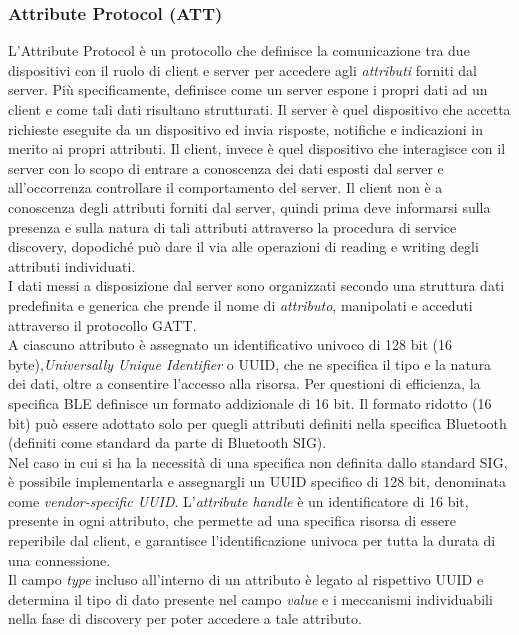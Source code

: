 \subsubsection{Attribute Protocol (ATT)}
L'Attribute Protocol è un protocollo che definisce la comunicazione tra due dispositivi con il ruolo di client e server per accedere agli \textit{attributi} forniti dal server. Più specificamente, definisce come un server espone i propri dati ad un client e come tali dati risultano strutturati.
Il server è quel dispositivo che accetta richieste eseguite da un dispositivo ed invia risposte, notifiche e indicazioni in merito ai propri attributi. %
Il client, invece è quel dispositivo che interagisce con il server con lo scopo di entrare a conoscenza dei dati esposti dal server e all'occorrenza controllare il comportamento del server. Il client non è a conoscenza degli attributi forniti dal server, quindi prima deve informarsi sulla presenza e sulla natura di tali attributi attraverso la procedura di service discovery, dopodiché può dare il via alle operazioni di reading e writing degli attributi individuati.\\
I dati messi a disposizione dal server sono organizzati secondo una struttura dati predefinita e generica che prende il nome di \textit{attributo}, manipolati e acceduti attraverso il protocollo GATT.\\
A ciascuno attributo è assegnato un identificativo univoco di 128 bit (16 byte),\textit{Universally Unique Identifier} o UUID, che ne specifica il tipo e la natura dei dati, oltre a consentire l'accesso alla risorsa. Per questioni di efficienza, la specifica BLE definisce un formato addizionale di 16 bit. Il formato ridotto (16 bit) può essere adottato solo per quegli attributi definiti nella specifica Bluetooth (definiti come standard da parte di Bluetooth SIG). \\
Nel caso in cui si ha la necessità di una specifica non definita dallo standard SIG, è possibile implementarla e assegnargli un UUID specifico di 128 bit, denominata come \textit{vendor-specific UUID}.
L'\textit{attribute handle} è un identificatore di 16 bit, presente in ogni attributo, che permette ad una specifica risorsa di essere reperibile dal client, e garantisce l'identificazione univoca per tutta la durata di una connessione.\\
Il campo \textit{type} incluso all'interno di un attributo è legato al rispettivo UUID e determina il tipo di dato presente nel campo \textit{value} e i meccanismi individuabili nella fase di discovery per poter accedere a tale attributo.\\
